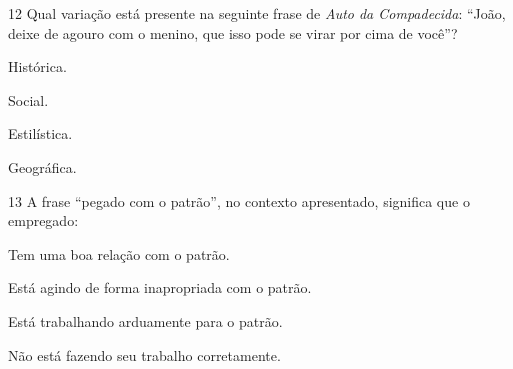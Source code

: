 \num{12} Qual variação está presente na seguinte frase de \emph{Auto da
Compadecida}: ``João, deixe de agouro com o menino, que isso pode se
virar por cima de você''?

\begin{escolha}
\item
  Histórica.
\item
  Social.
\item
  Estilística.
\item
  Geográfica.
\end{escolha}






\num{13} A frase ``pegado com o patrão'', no contexto apresentado,
significa que o empregado:

\begin{escolha}
\item Tem uma boa relação com o patrão.
\item Está agindo de forma inapropriada com o patrão.
\item Está trabalhando arduamente para o patrão.
\item Não está fazendo seu trabalho corretamente.
\end{escolha}



